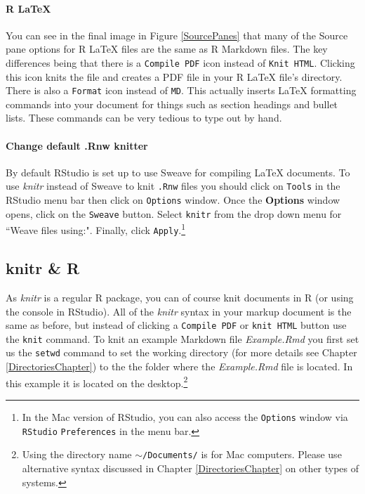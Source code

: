 \documentclass[krantz1]{krantz}
\begin{document}
\paragraph{R LaTeX}

You can see in the final image in Figure \ref{SourcePanes} that many of the Source pane options for R LaTeX files are the same as R Markdown files. The key differences being that there is a \texttt{Compile PDF} icon instead of \texttt{Knit HTML}. Clicking this icon knits the file and creates a PDF file in your R LaTeX file's directory. There is also a \texttt{Format} icon instead of \texttt{MD}. This actually inserts LaTeX formatting commands into your document for things such as section headings and bullet lists. These commands can be very tedious to type out by hand.


\paragraph{Change default .Rnw knitter}

By default RStudio is set up to use Sweave for compiling LaTeX documents. To use {\emph{knitr}} instead of Sweave to knit \texttt{.Rnw} files you should click on \texttt{Tools} in the RStudio menu bar then click on \texttt{Options} window. Once the {\bf{Options}} window opens, click on the \texttt{Sweave} button. Select \texttt{knitr} from the drop down menu for ``Weave files using:". Finally, click \texttt{Apply}.\footnote{In the Mac version of RStudio, you can also access the \texttt{Options} window via \texttt{RStudio} \textrightarrow \texttt{Preferences} in the menu bar.} 

\subsection{knitr \& R}

As {\emph{knitr}} is a regular R package, you can of course knit documents in R (or using the console in RStudio). All of the {\emph{knitr}} syntax in your markup document is the same as before, but instead of clicking a {\tt{Compile PDF}} or {\tt{knit HTML}} button use the {\tt{knit}} command. To knit an example Markdown file {\emph{Example.Rmd}} you first set us the \texttt{setwd} command to set the working directory (for more details see Chapter \ref{DirectoriesChapter}) to the the folder where the {\emph{Example.Rmd}} file is located. In this example it is located on the desktop.\footnote{Using the directory name {\tt{$\sim$/Documents/}} is for Mac computers. Please use alternative syntax discussed in Chapter \ref{DirectoriesChapter} on other types of systems.}
\end{document}
